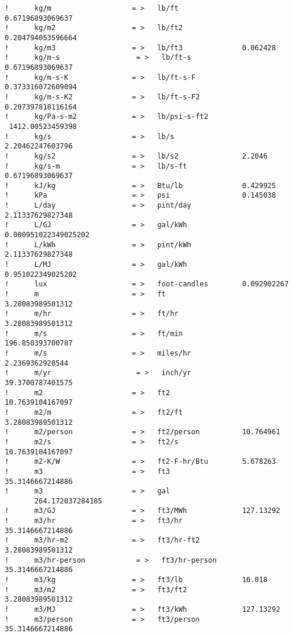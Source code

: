 \begin{lstlisting}
!      kg/m                   = >   lb/ft               0.67196893069637
!      kg/m2                  = >   lb/ft2              0.204794053596664
!      kg/m3                  = >   lb/ft3              0.062428
!      kg/m-s                  = >   lb/ft-s             0.67196893069637
!      kg/m-s-K               = >   lb/ft-s-F           0.373316072609094
!      kg/m-s-K2              = >   lb/ft-s-F2          0.207397818116164
!      kg/Pa-s-m2             = >   lb/psi-s-ft2        1412.00523459398
!      kg/s                   = >   lb/s                2.20462247603796
!      kg/s2                  = >   lb/s2               2.2046
!      kg/s-m                 = >   lb/s-ft             0.67196893069637
!      kJ/kg                  = >   Btu/lb              0.429925
!      kPa                    = >   psi                 0.145038
!      L/day                  = >   pint/day            2.11337629827348
!      L/GJ                   = >   gal/kWh             0.000951022349025202
!      L/kWh                  = >   pint/kWh            2.11337629827348
!      L/MJ                   = >   gal/kWh             0.951022349025202
!      lux                    = >   foot-candles        0.092902267
!      m                      = >   ft                  3.28083989501312
!      m/hr                   = >   ft/hr               3.28083989501312
!      m/s                    = >   ft/min              196.850393700787
!      m/s                    = >   miles/hr            2.2369362920544
!      m/yr                    = >   inch/yr             39.3700787401575
!      m2                     = >   ft2                 10.7639104167097
!      m2/m                   = >   ft2/ft              3.28083989501312
!      m2/person              = >   ft2/person          10.764961
!      m2/s                   = >   ft2/s               10.7639104167097
!      m2-K/W                 = >   ft2-F-hr/Btu        5.678263
!      m3                     = >   ft3                 35.3146667214886
!      m3                     = >   gal                 264.172037284185
!      m3/GJ                  = >   ft3/MWh             127.13292
!      m3/hr                  = >   ft3/hr              35.3146667214886
!      m3/hr-m2               = >   ft3/hr-ft2          3.28083989501312
!      m3/hr-person            = >   ft3/hr-person       35.3146667214886
!      m3/kg                  = >   ft3/lb              16.018
!      m3/m2                  = >   ft3/ft2             3.28083989501312
!      m3/MJ                  = >   ft3/kWh             127.13292
!      m3/person              = >   ft3/person          35.3146667214886

\end{lstlisting}
